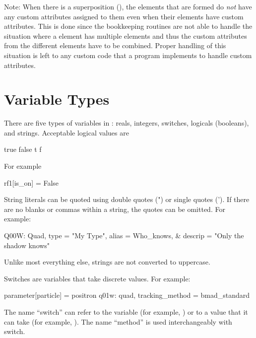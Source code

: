 {{{Note: When there is a superposition (), the  elements that are formed
do {\em not} have any custom attributes assigned to them even when their  elements
have custom attributes. This is done since the \bmad bookkeeping routines are not able to handle the
situation where a  element has multiple  elements and thus the custom
attributes from the different  elements have to be combined. Proper handling of this
situation is left to any custom code that a program implements to handle custom attributes.

\section{Variable Types}
\label{s:var.types}

There are five types of variables in \bmad: reals, integers, switches,
logicals (booleans), and strings. Acceptable logical values are
\begin{example}
   true    false
   t       f
\end{example}
For example
\begin{example}
  rf1[is_on] = False
\end{example}

String literals can be quoted using double quotes (") or single quotes ('). 
If there are no
blanks or commas within a string, the quotes can be omitted. For example:
\begin{example}
  Q00W: Quad, type = "My Type", alias = Who_knows, &
                                  descrip = "Only the shadow knows"
\end{example}
Unlike most everything else, strings are not converted to uppercase.

Switches are variables that take discrete values. For example:
\begin{example}
  parameter[particle] = positron          
  q01w: quad, tracking_method = bmad_standard 
\end{example}
The name ``switch'' can refer to the variable (for example,
) or to a value that it can take (for example,
). The name ``method'' is used interchangeably with switch.

\newpage

}}}
